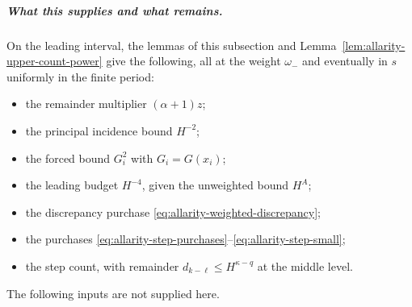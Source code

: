 \subparagraph{What this supplies and what remains.}
On the leading interval, the lemmas of this subsection and
Lemma~\ref{lem:allarity-upper-count-power} give the following, all at
the weight $\omega_-$ and eventually in $s$ uniformly in the finite
period:
\begin{itemize}
\item the remainder multiplier $(\alpha+1)z$;
\item the principal incidence bound $H^{-2}$;
\item the forced bound $G_i^2$ with $G_i=G(x_i)$;
\item the leading budget $H^{-4}$, given the unweighted bound $H^A$;
\item the discrepancy purchase \eqref{eq:allarity-weighted-discrepancy};
\item the purchases
 \eqref{eq:allarity-step-purchases}--\eqref{eq:allarity-step-small};
\item the step count, with remainder $d_{k-\ell}\le H^{\kappa-q}$ at the
 middle level.
\end{itemize}
The following inputs are not supplied here.

